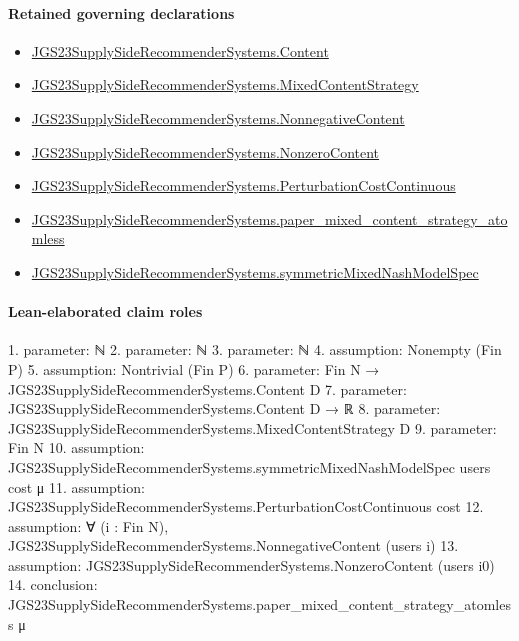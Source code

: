 \documentclass[10pt]{article}
\begin{document}
\paragraph{Retained governing declarations}
\begin{itemize}\raggedright
\item \hyperlink{governing-declaration-367305fda50f0ada}{JGS23\allowbreak{}Supply\allowbreak{}Side\allowbreak{}Recommender\allowbreak{}Systems.\allowbreak{}Content}
\item \hyperlink{governing-declaration-2089965d06cf0282}{JGS23\allowbreak{}Supply\allowbreak{}Side\allowbreak{}Recommender\allowbreak{}Systems.\allowbreak{}Mixed\allowbreak{}Content\allowbreak{}Strategy}
\item \hyperlink{governing-declaration-d426babe40b9593c}{JGS23\allowbreak{}Supply\allowbreak{}Side\allowbreak{}Recommender\allowbreak{}Systems.\allowbreak{}Nonnegative\allowbreak{}Content}
\item \hyperlink{governing-declaration-90e2ac7d13788c50}{JGS23\allowbreak{}Supply\allowbreak{}Side\allowbreak{}Recommender\allowbreak{}Systems.\allowbreak{}Nonzero\allowbreak{}Content}
\item \hyperlink{governing-declaration-0d3b6ecbfa8091f6}{JGS23\allowbreak{}Supply\allowbreak{}Side\allowbreak{}Recommender\allowbreak{}Systems.\allowbreak{}Perturbation\allowbreak{}Cost\allowbreak{}Continuous}
\item \hyperlink{governing-declaration-1b2f34d094067dea}{JGS23\allowbreak{}Supply\allowbreak{}Side\allowbreak{}Recommender\allowbreak{}Systems.\allowbreak{}paper\_\allowbreak{}mixed\_\allowbreak{}content\_\allowbreak{}strategy\_\allowbreak{}atomless}
\item \hyperlink{paper-prerequisite-b412efba7deb757f}{JGS23\allowbreak{}Supply\allowbreak{}Side\allowbreak{}Recommender\allowbreak{}Systems.\allowbreak{}symmetric\allowbreak{}Mixed\allowbreak{}Nash\allowbreak{}Model\allowbreak{}Spec}
\end{itemize}
\paragraph{Lean-elaborated claim roles}\begin{ReviewVerbatim}
1. parameter: ℕ
2. parameter: ℕ
3. parameter: ℕ
4. assumption: Nonempty (Fin P)
5. assumption: Nontrivial (Fin P)
6. parameter: Fin N → JGS23SupplySideRecommenderSystems.Content D
7. parameter: JGS23SupplySideRecommenderSystems.Content D → ℝ
8. parameter: JGS23SupplySideRecommenderSystems.MixedContentStrategy D
9. parameter: Fin N
10. assumption: JGS23SupplySideRecommenderSystems.symmetricMixedNashModelSpec users cost μ
11. assumption: JGS23SupplySideRecommenderSystems.PerturbationCostContinuous cost
12. assumption: ∀ (i : Fin N), JGS23SupplySideRecommenderSystems.NonnegativeContent (users i)
13. assumption: JGS23SupplySideRecommenderSystems.NonzeroContent (users i0)
14. conclusion: JGS23SupplySideRecommenderSystems.paper_mixed_content_strategy_atomless μ
\end{ReviewVerbatim}
\end{document}

